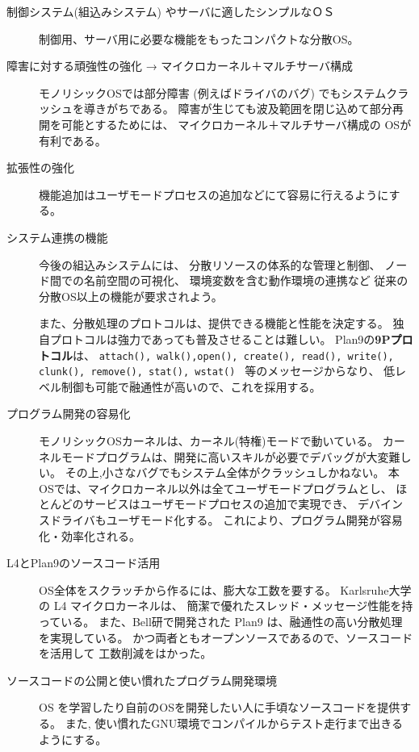 \documentclass{ipsjpapers}
\begin{document}
\begin{description}

\item[制御システム(組込みシステム) やサーバに適したシンプルなＯＳ]
      制御用、サーバ用に必要な機能をもったコンパクトな分散OS。
    
\item[障害に対する頑強性の強化 → マイクロカーネル＋マルチサーバ構成]
    モノリシックOSでは部分障害 (例えばドライバのバグ) でもシステムクラッシュを導きがちである。
     障害が生じても波及範囲を閉じ込めて部分再開を可能とするためには、
    マイクロカーネル＋マルチサーバ構成の OSが有利である。
    
\item[拡張性の強化]
    機能追加はユーザモードプロセスの追加などにて容易に行えるようにする。

\item[システム連携の機能]
   今後の組込みシステムには、
   分散リソースの体系的な管理と制御、
   ノード間での名前空間の可視化、
   環境変数を含む動作環境の連携など
   従来の分散OS以上の機能が要求されよう。

  また、分散処理のプロトコルは、提供できる機能と性能を決定する。
  独自プロトコルは強力であっても普及させることは難しい。
  Plan9の{\bf 9Pプロトコル}は、
  {\tt attach(), walk(),open(), create(), 
  read(), write(), clunk(), remove(), stat(), wstat() }
  等のメッセージからなり、
  低レベル制御も可能で融通性が高いので、これを採用する。


\item[プログラム開発の容易化]
   モノリシックOSカーネルは、カーネル(特権)モードで動いている。
   カーネルモードプログラムは、開発に高いスキルが必要でデバッグが大変難しい。
   その上,小さなバグでもシステム全体がクラッシュしかねない。
   本OSでは、マイクロカーネル以外は全てユーザモードプログラムとし、
   ほとんどのサービスはユーザモードプロセスの追加で実現でき、
   デバインスドライバもユーザモード化する。
   これにより、プログラム開発が容易化・効率化される。

\item[L4とPlan9のソースコード活用]  
    OS全体をスクラッチから作るには、膨大な工数を要する。
    Karlsruhe大学の L4 マイクロカーネルは、 
    簡潔で優れたスレッド・メッセージ性能を持っている。
    また、Bell研で開発された Plan9 は、融通性の高い分散処理を実現している。
    かつ両者ともオープンソースであるので、ソースコードを活用して
    工数削減をはかった。
    
\item[ソースコードの公開と使い慣れたプログラム開発環境]
      OS を学習したり自前のOSを開発したい人に手頃なソースコードを提供する。
    また, 使い慣れたGNU環境でコンパイルからテスト走行まで出きるようにする。

\end{description}    
\end{document}
